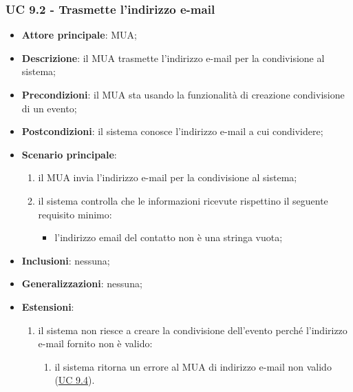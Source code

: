     \subsubsection{UC 9.2 - Trasmette l'indirizzo e-mail} \label{sec:UC9.2}
    \begin{itemize}
        \item \textbf{Attore principale}: MUA;
        \item \textbf{Descrizione}: il MUA trasmette l'indirizzo e-mail per la condivisione al sistema;
        \item \textbf{Precondizioni}: il MUA sta usando la funzionalità di creazione condivisione di un evento;
        \item \textbf{Postcondizioni}: il sistema conosce l'indirizzo e-mail a cui condividere;
        \item \textbf{Scenario principale}:
            \begin{enumerate}
                \item il MUA invia l'indirizzo e-mail per la condivisione al sistema;
                \item il sistema controlla che le informazioni ricevute rispettino il seguente requisito minimo:
                    \begin{itemize}
                        \item l'indirizzo email del contatto non è una stringa vuota;
                    \end{itemize}
            \end{enumerate}
        \item \textbf{Inclusioni}: nessuna;
        \item \textbf{Generalizzazioni}: nessuna;
        \item \textbf{Estensioni}:
            \begin{enumerate}[label=\alph*.]
                \item il sistema non riesce a creare la condivisione dell'evento perché l'indirizzo e-mail fornito non è valido:
                \begin{enumerate}[label=\arabic*.]
                    \item il sistema ritorna un errore al MUA di indirizzo e-mail non valido (\hyperref[sec:UC9.4]{UC 9.4}).
                \end{enumerate}
            \end{enumerate}
    \end{itemize}


